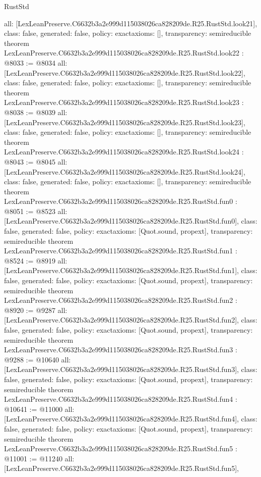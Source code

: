 \begin{lexlean}{RustStd}
\begin{coremodule}
{  all: [LexLeanPreserve.C6632b3a2e999d115038026ca828209de.R25.RustStd.look21],
  class: false,
  generated: false,
  policy: exact{axioms: []},
  transparency: semireducible
}
theorem LexLeanPreserve.C6632b3a2e999d115038026ca828209de.R25.RustStd.look22 : @8033 := @8034 {
  all: [LexLeanPreserve.C6632b3a2e999d115038026ca828209de.R25.RustStd.look22],
  class: false,
  generated: false,
  policy: exact{axioms: []},
  transparency: semireducible
}
theorem LexLeanPreserve.C6632b3a2e999d115038026ca828209de.R25.RustStd.look23 : @8038 := @8039 {
  all: [LexLeanPreserve.C6632b3a2e999d115038026ca828209de.R25.RustStd.look23],
  class: false,
  generated: false,
  policy: exact{axioms: []},
  transparency: semireducible
}
theorem LexLeanPreserve.C6632b3a2e999d115038026ca828209de.R25.RustStd.look24 : @8043 := @8045 {
  all: [LexLeanPreserve.C6632b3a2e999d115038026ca828209de.R25.RustStd.look24],
  class: false,
  generated: false,
  policy: exact{axioms: []},
  transparency: semireducible
}
theorem LexLeanPreserve.C6632b3a2e999d115038026ca828209de.R25.RustStd.fun0 : @8051 := @8523 {
  all: [LexLeanPreserve.C6632b3a2e999d115038026ca828209de.R25.RustStd.fun0],
  class: false,
  generated: false,
  policy: exact{axioms: [Quot.sound, propext]},
  transparency: semireducible
}
theorem LexLeanPreserve.C6632b3a2e999d115038026ca828209de.R25.RustStd.fun1 : @8524 := @8919 {
  all: [LexLeanPreserve.C6632b3a2e999d115038026ca828209de.R25.RustStd.fun1],
  class: false,
  generated: false,
  policy: exact{axioms: [Quot.sound, propext]},
  transparency: semireducible
}
theorem LexLeanPreserve.C6632b3a2e999d115038026ca828209de.R25.RustStd.fun2 : @8920 := @9287 {
  all: [LexLeanPreserve.C6632b3a2e999d115038026ca828209de.R25.RustStd.fun2],
  class: false,
  generated: false,
  policy: exact{axioms: [Quot.sound, propext]},
  transparency: semireducible
}
theorem LexLeanPreserve.C6632b3a2e999d115038026ca828209de.R25.RustStd.fun3 : @9288 := @10640 {
  all: [LexLeanPreserve.C6632b3a2e999d115038026ca828209de.R25.RustStd.fun3],
  class: false,
  generated: false,
  policy: exact{axioms: [Quot.sound, propext]},
  transparency: semireducible
}
theorem LexLeanPreserve.C6632b3a2e999d115038026ca828209de.R25.RustStd.fun4 : @10641 := @11000 {
  all: [LexLeanPreserve.C6632b3a2e999d115038026ca828209de.R25.RustStd.fun4],
  class: false,
  generated: false,
  policy: exact{axioms: [Quot.sound, propext]},
  transparency: semireducible
}
theorem LexLeanPreserve.C6632b3a2e999d115038026ca828209de.R25.RustStd.fun5 : @11001 := @11240 {
  all: [LexLeanPreserve.C6632b3a2e999d115038026ca828209de.R25.RustStd.fun5],
}
\end{coremodule}
\end{lexlean}
